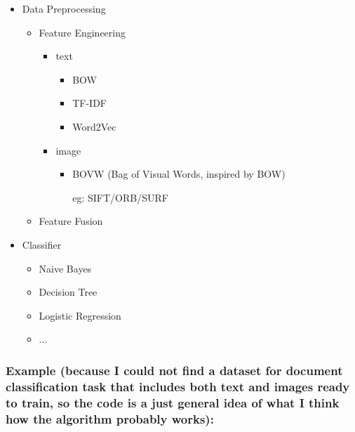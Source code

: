 \documentclass[11pt]{article}
\providecommand{\tightlist}{%
      \setlength{\itemsep}{0pt}\setlength{\parskip}{0pt}}
\begin{document}
\begin{itemize}
\tightlist
\item
  Data Preprocessing

  \begin{itemize}
  \tightlist
  \item
    Feature Engineering

    \begin{itemize}
    \tightlist
    \item
      text

      \begin{itemize}
      \tightlist
      \item
        BOW
      \item
        TF-IDF
      \item
        Word2Vec
      \end{itemize}
    \item
      image

      \begin{itemize}
      \tightlist
      \item
        BOVW (Bag of Visual Words, inspired by BOW)

        eg: SIFT/ORB/SURF
      \end{itemize}
    \end{itemize}
  \item
    Feature Fusion
  \end{itemize}
\item
  Classifier

  \begin{itemize}
  \tightlist
  \item
    Naive Bayes
  \item
    Decision Tree
  \item
    Logistic Regression
  \item
    ...
  \end{itemize}
\end{itemize}

    \subsubsection*{Example (because I could not find a dataset for document
classification task that includes both text and images ready to train,
so the code is a just general idea of what I think how the algorithm probably
works):}\label{example-because-i-could-not-find-a-dataset-for-document-classification-task-that-includes-both-text-and-images-ready-to-train-so-the-code-is-a-general-idea-of-what-i-think-how-the-algorithm-probably-works}
\end{document}

